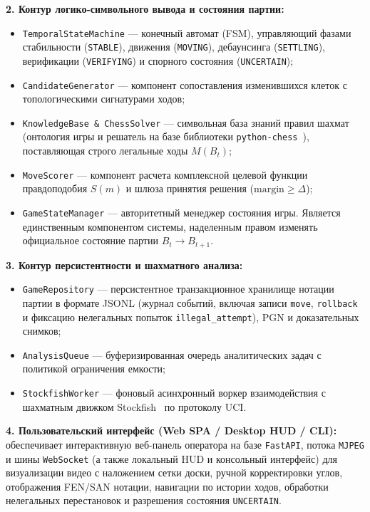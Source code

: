 \textbf{2. Контур логико-символьного вывода и состояния партии:}
\begin{itemize}
    \item \texttt{TemporalStateMachine} --- конечный автомат (FSM), управляющий фазами стабильности (\texttt{STABLE}), движения (\texttt{MOVING}), дебаунсинга (\texttt{SETTLING}), верификации (\texttt{VERIFYING}) и спорного состояния (\texttt{UNCERTAIN});
    \item \texttt{CandidateGenerator} --- компонент сопоставления изменившихся клеток с топологическими сигнатурами ходов;
    \item \texttt{KnowledgeBase \& ChessSolver} --- символьная база знаний правил шахмат (онтология игры и решатель на базе библиотеки \texttt{python-chess}~\cite{Fiekas2024}), поставляющая строго легальные ходы $M(B_t)$;
    \item \texttt{MoveScorer} --- компонент расчета комплексной целевой функции правдоподобия $S(m)$ и шлюза принятия решения ($\text{margin} \ge \Delta$);
    \item \texttt{GameStateManager} --- авторитетный менеджер состояния игры. Является единственным компонентом системы, наделенным правом изменять официальное состояние партии $B_t \to B_{t+1}$.
\end{itemize}

\textbf{3. Контур персистентности и шахматного анализа:}
\begin{itemize}
    \item \texttt{GameRepository} --- персистентное транзакционное хранилище нотации партии в формате JSONL (журнал событий, включая записи \texttt{move}, \texttt{rollback} и фиксацию нелегальных попыток \texttt{illegal\_attempt}), PGN и доказательных снимков;
    \item \texttt{AnalysisQueue} --- буферизированная очередь аналитических задач с политикой ограничения емкости;
    \item \texttt{StockfishWorker} --- фоновый асинхронный воркер взаимодействия с шахматным движком Stockfish~\cite{Romstad2024} по протоколу UCI.
\end{itemize}

\textbf{4. Пользовательский интерфейс (Web SPA / Desktop HUD / CLI):} обеспечивает интерактивную веб-панель оператора на базе \texttt{FastAPI}, потока \texttt{MJPEG} и шины \texttt{WebSocket} (а также локальный HUD и консольный интерфейс) для визуализации видео с наложением сетки доски, ручной корректировки углов, отображения FEN/SAN нотации, навигации по истории ходов, обработки нелегальных перестановок и разрешения состояния \texttt{UNCERTAIN}.

